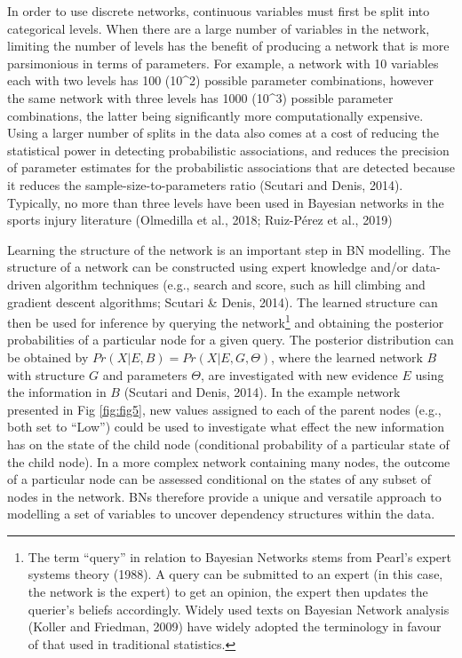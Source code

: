 \documentclass[
]{frontiersHLTH}
\begin{document}
In order to use discrete networks, continuous variables must first be
split into categorical levels. When there are a large number of
variables in the network, limiting the number of levels has the benefit
of producing a network that is more parsimonious in terms of parameters.
For example, a network with 10 variables each with two levels has 100
(10\^{}2) possible parameter combinations, however the same network with
three levels has 1000 (10\^{}3) possible parameter combinations, the
latter being significantly more computationally expensive. Using a
larger number of splits in the data also comes at a cost of reducing the
statistical power in detecting probabilistic associations, and reduces
the precision of parameter estimates for the probabilistic associations
that are detected because it reduces the sample-size-to-parameters ratio
(Scutari and Denis, 2014). Typically, no more than three levels have
been used in Bayesian networks in the sports injury literature
(Olmedilla et al., 2018; Ruiz-Pérez et al., 2019)

Learning the structure of the network is an important step in BN
modelling. The structure of a network can be constructed using expert
knowledge and/or data-driven algorithm techniques (e.g., search and
score, such as hill climbing and gradient descent algorithms; Scutari \&
Denis, 2014). The learned structure can then be used for inference by
querying the network\footnote{The term ``query'' in relation to Bayesian
  Networks stems from Pearl's expert systems theory (1988). A query can
  be submitted to an expert (in this case, the network is the expert) to
  get an opinion, the expert then updates the querier's beliefs
  accordingly. Widely used texts on Bayesian Network analysis (Koller
  and Friedman, 2009) have widely adopted the terminology in favour of
  that used in traditional statistics.} and obtaining the posterior
probabilities of a particular node for a given query. The posterior
distribution can be obtained by \(Pr(X|E,B) = Pr(X|E,G,\Theta)\), where
the learned network \(B\) with structure \(G\) and parameters
\(\Theta\), are investigated with new evidence \(E\) using the
information in \(B\) (Scutari and Denis, 2014). In the example network
presented in Fig \ref{fig:fig5}, new values assigned to each of the
parent nodes (e.g., both set to ``Low'') could be used to investigate
what effect the new information has on the state of the child node
(conditional probability of a particular state of the child node). In a
more complex network containing many nodes, the outcome of a particular
node can be assessed conditional on the states of any subset of nodes in
the network. BNs therefore provide a unique and versatile approach to
modelling a set of variables to uncover dependency structures within the
data.
\end{document}
